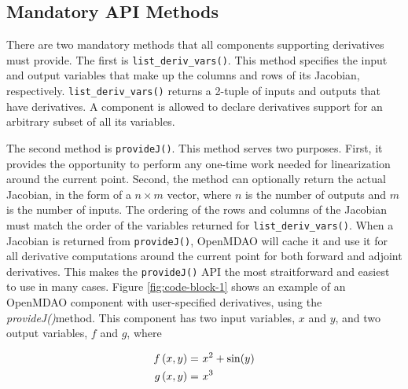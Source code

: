 \documentclass[]{aiaa-tc} %
\begin{document}
        \subsection{Mandatory API Methods}

        There are two mandatory methods that all components supporting derivatives must provide.
        The first is \texttt{list\_deriv\_vars()}. This method specifies the
        input and output variables that make up the columns and rows of its Jacobian, respectively.
        \texttt{list\_deriv\_vars()} returns a 2-tuple of inputs and outputs that have derivatives.
        A component is allowed to declare derivatives support for an arbitrary subset of all its variables.

        The second method is \texttt{provideJ()}. This method serves two purposes. First, it provides the
        opportunity to perform any one-time work needed for linearization around the current point. Second,
        the method can optionally return the actual Jacobian, in the form of a $n \times m$ vector, where $n$ is the
        number of outputs and $m$ is the number of inputs. The ordering of the rows and columns of the Jacobian
        must match the order of the variables returned for \texttt{list\_deriv\_vars()}. When a Jacobian is
        returned from \texttt{provideJ()}, OpenMDAO will cache it and use it for all derivative computations
        around the current point for both forward and adjoint derivatives. This makes the \texttt{provideJ()}
        API the most straitforward and easiest to use in many cases. Figure \ref{fig:code-block-1} shows
        an example of an OpenMDAO component with user-specified derivatives, using the \textit{provideJ()}method.
        This component has two input variables, $x$ and $y$, and two output variables, $f$ and $g$, where

        \begin{align}
            f\left(x, y\right) =&\  x^2 + \sin(y) \\ \notag
            g\left(x, y\right) =&\  x^3
        \end{align}
\end{document}
